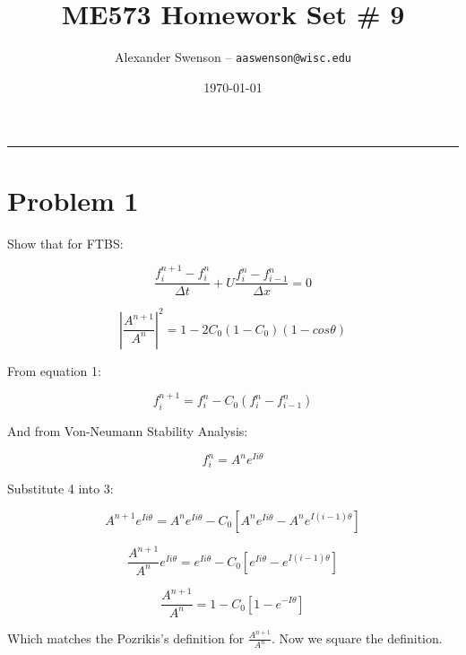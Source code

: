 \documentclass[12pt]{article}
\title{ME573 Homework Set \# 9}
\author{Alexander Swenson -- \texttt{aaswenson@wisc.edu}}
\date{\today}
\begin{document}
	
	\maketitle
	
	\vspace{-0.3in}
	\noindent
	\rule{\linewidth}{0.4pt}
	
	\noindent
	

	
	
	\section{Problem 1}
	
	Show that for FTBS:
	
	\begin{equation}
	\frac{f_i^{n+1}-f_i^n}{\Delta t} + U \frac{f_i^n - f_{i-1}^n}{\Delta x} = 0
	\end{equation}
	
	\begin{equation}
	|\frac{A^{n+1}}{A^n}| ^2 = 1 - 2C_0(1-C_0)(1-cos\theta)
	\end{equation}
	
	From equation 1:
	
	\begin{equation}
	f_i^{n+1} = f_i^n - C_0(f_i^n - f_{i-1}^n)
	\end{equation}
	
	And from Von-Neumann Stability Analysis:
	
	\begin{equation}
		f_i^n = A^n e^{Ii\theta}
	\end{equation}
	
	Substitute 4 into 3:
	
	\begin{equation}
		A^{n+1}e^{Ii\theta} = A^ne^{Ii\theta} - C_0[A^ne^{Ii\theta} - A^ne^{I(i-1)\theta}]
	\end{equation}
	
	\begin{equation}
		\frac{A^{n+1}}{A^n}e^{Ii\theta} = e^{Ii\theta} - C_0[e^{Ii\theta} - e^{I(i-1)\theta}]
	\end{equation}
	
	\begin{equation}
		\frac{A^{n+1}}{A^n} = 1 - C_0[1 - e^{-I\theta}]	
	\end{equation}
	
	Which matches the Pozrikis's definition for $\frac{A^{n+1}}{A^n}$. Now we square the definition.
	
\end{document}
